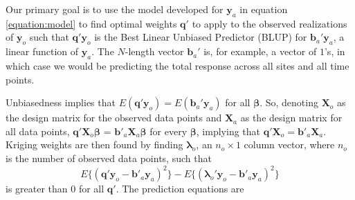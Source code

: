 \documentclass[]{article}    %
\begin{document}
Our primary goal is to use the model developed for \(\mathbf{y}_a\) in
equation \ref{equation:model} to find optimal weights \(\mathbf{q}'\) to
apply to the observed realizations of \(\mathbf{y}_o\) such that
\(\mathbf{q}' \mathbf{y}_o\) is the Best Linear Unbiased Predictor
(BLUP) for \(\mathbf{b}_a' \mathbf{y}_a\), a linear function of
\(\mathbf{y}_a\). The \(N\)-length vector \(\mathbf{b}_a'\) is, for
example, a vector of \(1\)'s, in which case we would be predicting the
total response across all sites and all time points.

Unbiasedness implies that
\(E(\mathbf{q'}\mathbf{y}_o) = E(\mathbf{b}_a'\mathbf{y}_a)\) for all
\(\bm{\beta}\). So, denoting \(\mathbf{X}_o\) as the design matrix for
the observed data points and \(\mathbf{X}_a\) as the design matrix for
all data points, \(\mathbf{q'} \mathbf{X}_o \bm{\beta}\) =
\(\mathbf{b'}_a \mathbf{X}_a \bm{\beta}\) for every \(\bm{\beta}\),
implying that \(\mathbf{q'} \mathbf{X}_o = \mathbf{b'}_a \mathbf{X}_a\).
Kriging weights are then found by finding \(\bm{\lambda}_o\), an
\(n_o \times 1\) column vector, where \(n_o\) is the number of observed
data points, such that \mbox{} \begin{equation}
E\{(\mathbf{q'}\mathbf{y}_o - \mathbf{b'}_a \mathbf{y}_a)^2\} - E\{(\bm{\lambda}_o'\mathbf{y}_o - \mathbf{b'}_a \mathbf{y}_a)^2\}
\end{equation} \noindent is greater than 0 for all \(\mathbf{q'}\). The
prediction equations are
\end{document}
